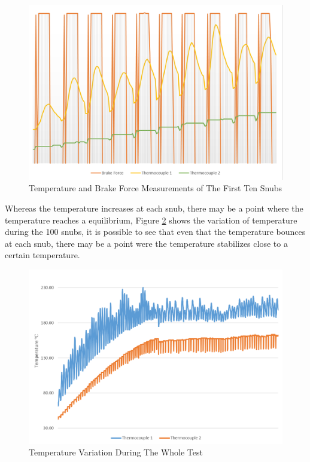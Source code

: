 		\begin{figure}[htbp]
				\centering
				\includegraphics[width=.8\textwidth]{figuras/fig-test-first-ten-snubs-force-temperature}
				\caption{Temperature and Brake Force Measurements of The First Ten Snubs}
				\label{fig:test-first-ten-snubs-force-temperature}
		\end{figure}

		\par

		Whereas the temperature increases at each snub, there may be a point where the temperature reaches a equilibrium, Figure \ref{fig:test-temperature} shows the variation of temperature during the 100 snubs, it is possible to see that even that the temperature bounces at each snub, there may be a point were the temperature stabilizes close to a certain temperature.

		\begin{figure}[htbp]
				\centering
				\includegraphics[width=.8\textwidth]{figuras/fig-test-temperature}
				\caption{Temperature Variation During The Whole Test}
				\label{fig:test-temperature}
		\end{figure}
		\par

